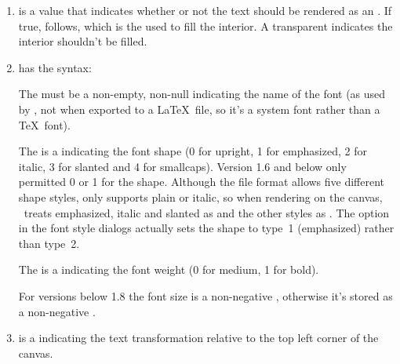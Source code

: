 \begin{numbered}
  \begin{enumerate}
  \item\label{jdr:outline}  is a 
  value that indicates whether or not the text should be rendered as
  an . If true,  follows, which is the
   used to fill the interior. A transparent 
  indicates the interior shouldn't be filled.

  \item\label{jdr:fontspecs}  has the syntax:
  \begin{syntaxline}
     
  \end{syntaxline}
  The  must be a non-empty, non-null 
  indicating the name of the font (as used by \FlowframTk, not
  when exported to a \LaTeX\ file, so it's a system font rather than a
  \TeX\ font).

  The  is a  indicating the font shape (0 for
  upright, 1 for emphasized, 2 for italic, 3 for slanted and 4 for
  smallcaps).  Version 1.6 and below only permitted 0 or 1 for the shape.
  Although the file format allows five different shape styles,
   only supports plain or italic, so when
  rendering on the \gls{canvas}, \FlowframTk\ treats emphasized,
  italic and slanted as  and the other styles as
  . The  option
  in the font style dialogs actually sets the shape to type~1 (emphasized) rather
  than type~2.

  The  is a  indicating the font weight (0 for medium,
  1 for bold).

  For versions below 1.8 the font size is a non-negative
  , otherwise it's stored as a non-negative
  .

  \item {} is a  indicating the
  text transformation relative to the top left corner of the
  \gls{canvas}.


\end{enumerate}
\end{numbered}
